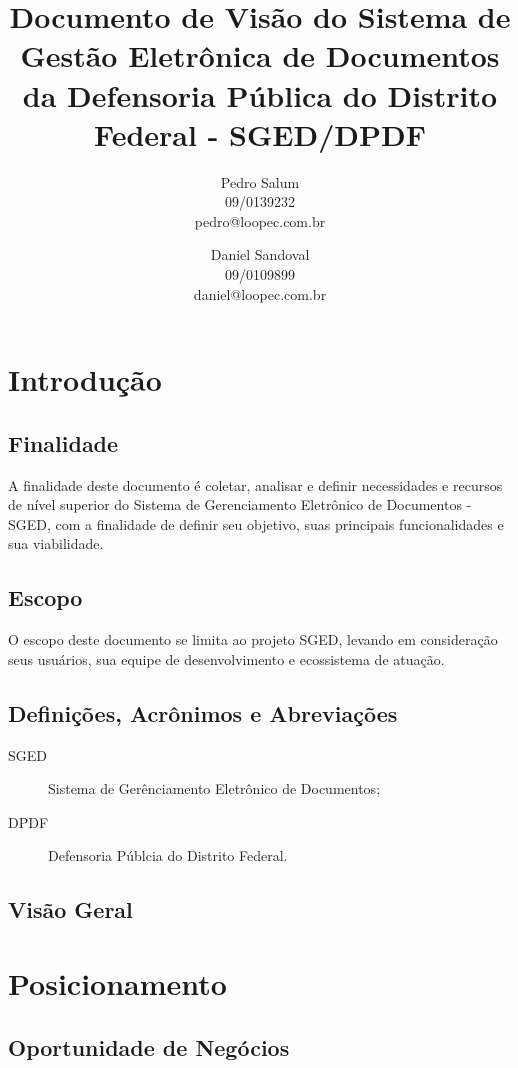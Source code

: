 \documentclass[12pt,a4paper]{report}
\title{Documento de Visão do Sistema de Gestão Eletrônica de Documentos da Defensoria Pública do Distrito Federal - SGED/DPDF}
\author{Pedro Salum\\
	09/0139232\\
	pedro@loopec.com.br
	\and
	Daniel Sandoval\\
	09/0109899\\
	daniel@loopec.com.br}
\begin{document}
\maketitle
\tableofcontents

\chapter{Introdução}

\section{Finalidade}

A finalidade deste documento é coletar, analisar e definir necessidades e recursos de nível superior do Sistema de Gerenciamento Eletrônico de Documentos - SGED, com a finalidade de definir seu objetivo, suas principais funcionalidades e sua viabilidade.

\section{Escopo}

O escopo deste documento se limita ao projeto SGED, levando em consideração seus usuários, sua equipe de desenvolvimento e ecossistema de atuação.

\section{Definições, Acrônimos e Abreviações}
\begin{description}
\item[SGED] Sistema de Gerênciamento Eletrônico de Documentos;
\item[DPDF] Defensoria Públcia do Distrito Federal.
\end{description}

\section{Visão Geral}

\chapter{Posicionamento}

\section{Oportunidade de Negócios}
\end{document}
